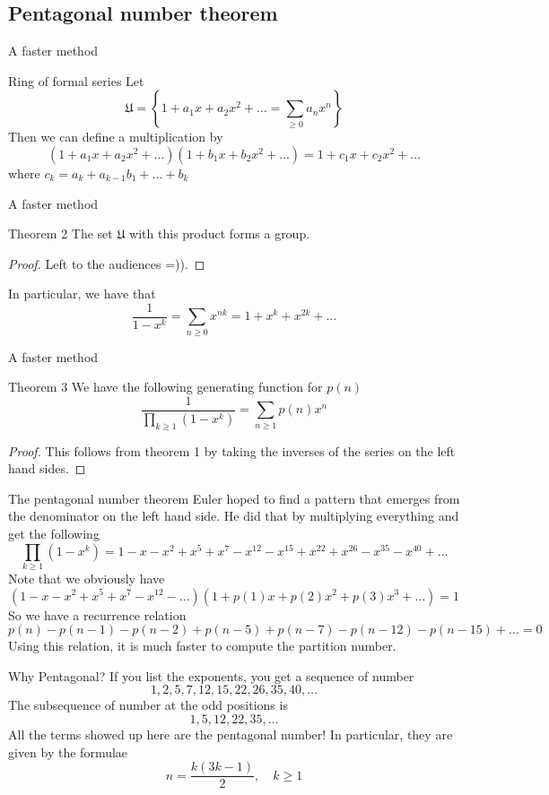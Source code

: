 \documentclass[pdf]{beamer}
\begin{document}
\subsection{Pentagonal number theorem}
\begin{frame}{A faster method}
\begin{block}{Ring of formal series}
    Let 
    \[\mathfrak{U} = \left\lbrace 1+a_1x+a_2x^2+\ldots = \sum_{\ge 0} a_nx^n\right\rbrace\]
    Then we can define a multiplication by 
    \[(1+a_1x+a_2x^2+\ldots)(1+b_1x+b_2x^2+\ldots) =1+c_1x+c_2x^2+\ldots\]
    where $c_k = a_k + a_{k-1}b_1+\ldots+b_k$
\end{block}
\end{frame}
\begin{frame}{A faster method}
    \begin{block}{Theorem 2}
        The set $\mathfrak{U}$ with this product forms a group.
    \end{block}
\begin{proof}
    Left to the audiences =)).
\end{proof}
In particular, we have that 
\[\dfrac{1}{1-x^k} = \sum_{n \ge 0} x^{nk} = 1+ x^k+x^{2k}+\ldots\]
\end{frame}
\begin{frame}{A faster method}
  \begin{block}{Theorem 3}
      We have the following generating function for $p(n)$
    \[
    \dfrac{1}{\prod_{k \ge 1} (1-x^k)} = \sum_{n \ge 1}p(n)x^n
    \]
\end{block}\pause
\begin{proof}
    This follows from theorem 1 by taking the inverses of the series on the left hand sides. 
\end{proof}
\end{frame}
\begin{frame}{The pentagonal number theorem}
Euler hoped to find a pattern that emerges from the denominator on the left hand side. He did that by multiplying everything and get the following
\[\prod_{k \ge 1} (1-x^k) = 1-x-x^2+x^5+x^7-x^{12}-x^{15}+x^{22}+x^{26}-x^{35}-x^{40}+\ldots\]
\pause
Note that we obviously have 
\[(1-x-x^2+x^5+x^7-x^{12}-\ldots)(1+p(1)x+p(2)x^2+p(3)x^3+\ldots)=1\]\pause
So we have a recurrence relation
\[p(n)-p(n-1)-p(n-2)+p(n-5)+p(n-7)-p(n-12)-p(n-15)+...=0\]
Using this relation, it is much faster to compute the partition number.
\end{frame}
\begin{frame}{Why Pentagonal?}
If you list the exponents, you get a sequence of number
\[1, 2,5,7,12,15,22,26,35,40,\ldots\]\pause
The subsequence of number at the odd positions is
\[1, 5, 12, 22,35,\ldots \]\pause
All the terms showed up here are the pentagonal number! In particular, they are given by the formulae
\[ n = \dfrac{k(3k-1)}{2}, \quad k \ge 1\]

\end{frame}
\end{document}
